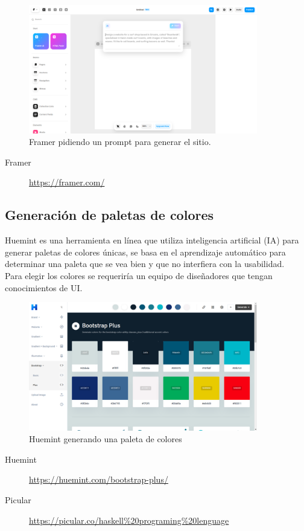 \documentclass[11pt]{article}
\begin{document}
\begin{figure}[htbp]
\centering
\includegraphics[width=10cm]{img/framer.png}
\caption{Framer pidiendo un prompt para generar el sitio.}
\end{figure}

\begin{description}
\item[{Framer}] \url{https://framer.com/}
\end{description}

\subsection{Generación de paletas de colores}
\label{sec:org1a16c40}
Huemint es una herramienta en línea que utiliza inteligencia
artificial (IA) para generar paletas de colores únicas, se basa en el
aprendizaje automático para determinar una paleta que se vea bien y
que no interfiera con la usabilidad. \\

Para elegir los colores se requeriría un equipo de diseñadores que
tengan conocimientos de UI.

\begin{figure}[htbp]
\centering
\includegraphics[width=10cm]{img/Huemint.png}
\caption{Huemint generando una paleta de colores}
\end{figure}

\begin{description}
\item[{Huemint}] \url{https://huemint.com/bootstrap-plus/}
\item[{Picular}] \url{https://picular.co/haskell\%20programing\%20lenguage}
\end{description}
\end{document}
